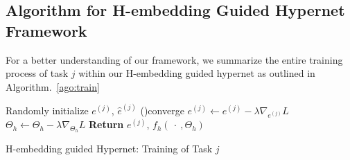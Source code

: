 \subsection{Algorithm for H-embedding Guided Hypernet Framework}
\label{sec:algorithm}

For a better understanding of our framework, we summarize the entire training process of task $j$ within our H-embedding guided hypernet as  outlined in Algorithm.~\ref{ago:train}

\begin{algorithm*}[!h]
    Randomly initialize $e^{(j)}$, $\hat{e}^{(j)}$\; 
    \Repeat(){converge}{
            $e^{(j)} \gets e^{(j)} - \lambda \nabla_{e^{(j)}} L $\;
            $\Theta_h \gets \Theta_h - \lambda \nabla_{\Theta_h} L$ 
        }
    \textbf{Return} $e^{(j)}$, $f_h(\ \cdot\ , \Theta_h)$
\caption{H-embedding guided Hypernet: Training of Task $j$}
\label{ago:train}
\end{algorithm*}



